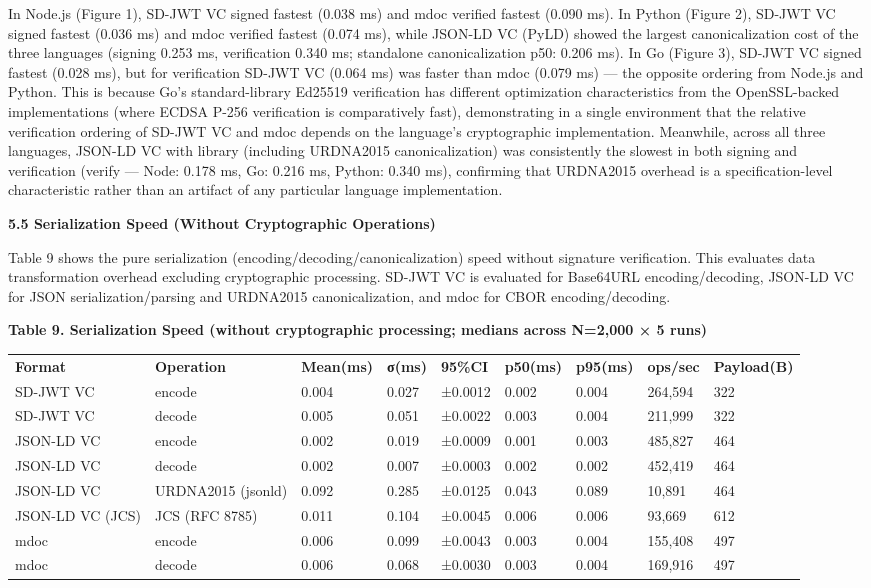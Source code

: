 In Node.js (Figure 1), SD-JWT VC signed fastest (0.038 ms) and mdoc verified fastest (0.090 ms). In Python (Figure 2), SD-JWT VC signed fastest (0.036 ms) and mdoc verified fastest (0.074 ms), while JSON-LD VC (PyLD) showed the largest canonicalization cost of the three languages (signing 0.253 ms, verification 0.340 ms; standalone canonicalization p50: 0.206 ms). In Go (Figure 3), SD-JWT VC signed fastest (0.028 ms), but for verification SD-JWT VC (0.064 ms) was faster than mdoc (0.079 ms) --- the opposite ordering from Node.js and Python. This is because Go's standard-library Ed25519 verification has different optimization characteristics from the OpenSSL-backed implementations (where ECDSA P-256 verification is comparatively fast), demonstrating in a single environment that the relative verification ordering of SD-JWT VC and mdoc depends on the language's cryptographic implementation. Meanwhile, across all three languages, JSON-LD VC with library (including URDNA2015 canonicalization) was consistently the slowest in both signing and verification (verify --- Node: 0.178 ms, Go: 0.216 ms, Python: 0.340 ms), confirming that URDNA2015 overhead is a specification-level characteristic rather than an artifact of any particular language implementation.

\textbf{5.5 Serialization Speed (Without Cryptographic Operations)}

Table 9 shows the pure serialization (encoding/decoding/canonicalization) speed without signature verification. This evaluates data transformation overhead excluding cryptographic processing. SD-JWT VC is evaluated for Base64URL encoding/decoding, JSON-LD VC for JSON serialization/parsing and URDNA2015 canonicalization, and mdoc for CBOR encoding/decoding.

\textbf{Table 9. Serialization Speed (without cryptographic processing; medians across N=2,000 × 5 runs)}

\begin{longtable}[]{@{}lllllllll@{}}
\toprule
\endhead
\textbf{Format} & \textbf{Operation} & \textbf{Mean(ms)} & \textbf{σ(ms)} & \textbf{95\%CI} & \textbf{p50(ms)} & \textbf{p95(ms)} & \textbf{ops/sec} & \textbf{Payload(B)}\tabularnewline
SD-JWT VC & encode & 0.004 & 0.027 & ±0.0012 & 0.002 & 0.004 & 264,594 & 322\tabularnewline
SD-JWT VC & decode & 0.005 & 0.051 & ±0.0022 & 0.003 & 0.004 & 211,999 & 322\tabularnewline
JSON-LD VC & encode & 0.002 & 0.019 & ±0.0009 & 0.001 & 0.003 & 485,827 & 464\tabularnewline
JSON-LD VC & decode & 0.002 & 0.007 & ±0.0003 & 0.002 & 0.002 & 452,419 & 464\tabularnewline
JSON-LD VC & URDNA2015 (jsonld) & 0.092 & 0.285 & ±0.0125 & 0.043 & 0.089 & 10,891 & 464\tabularnewline
JSON-LD VC (JCS) & JCS (RFC 8785) & 0.011 & 0.104 & ±0.0045 & 0.006 & 0.006 & 93,669 & 612\tabularnewline
mdoc & encode & 0.006 & 0.099 & ±0.0043 & 0.003 & 0.004 & 155,408 & 497\tabularnewline
mdoc & decode & 0.006 & 0.068 & ±0.0030 & 0.003 & 0.004 & 169,916 & 497\tabularnewline
\bottomrule
\end{longtable}


